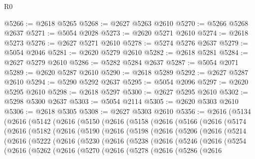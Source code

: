\begin{lexlean}{R0}
\begin{coremodule}
@5266 := @2618 @5265
@5268 := @2627 @5263 @2610
@5270 := @5266 @5268 @2637
@5271 := @5054 @2028
@5273 := @2620 @5271 @2610
@5274 := @2618 @5273
@5276 := @2627 @5271 @2610
@5278 := @5274 @5276 @2637
@5279 := @5054 @2046
@5281 := @2620 @5279 @2610
@5282 := @2618 @5281
@5284 := @2627 @5279 @2610
@5286 := @5282 @5284 @2637
@5287 := @5054 @2071
@5289 := @2620 @5287 @2610
@5290 := @2618 @5289
@5292 := @2627 @5287 @2610
@5294 := @5290 @5292 @2637
@5295 := @5054 @2096
@5297 := @2620 @5295 @2610
@5298 := @2618 @5297
@5300 := @2627 @5295 @2610
@5302 := @5298 @5300 @2637
@5303 := @5054 @2114
@5305 := @2620 @5303 @2610
@5306 := @2618 @5305
@5308 := @2627 @5303 @2610
@5356 := @2616
    (@5134
      (@2616
        (@5142
          (@2616
            (@5150
              (@2616
                (@5158
                  (@2616
                    (@5166
                      (@2616
                        (@5174
                          (@2616
                            (@5182
                              (@2616
                                (@5190
                                  (@2616
                                    (@5198
                                      (@2616
                                        (@5206
                                          (@2616
                                            (@5214
                                              (@2616
                                                (@5222
                                                  (@2616
                                                    (@5230
                                                      (@2616
                                                        (@5238
                                                          (@2616
                                                            (@5246
                                                              (@2616
                                                                (@5254
                                                                  (@2616
                                                                    (@5262
                                                                      (@2616
                                                                        (@5270
                                                                          (@2616
                                                                            (@5278
                                                                              (@2616
                                                                                (@5286
                                                                                  (@2616

\end{coremodule}
\end{lexlean}
